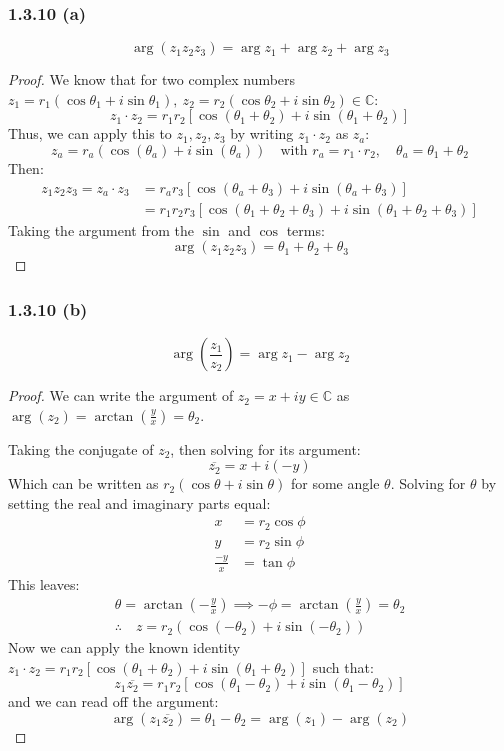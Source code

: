 \documentclass{article}
\begin{document}
\subsubsection*{1.3.10 (a)}
\[
  \arg(z_1 z_2 z_3) = \arg z_1 + \arg z_2 + \arg z_3
\]
\begin{proof}
  We know that for two complex numbers $z_1 = r_1(\cos\theta_1 + i\sin\theta_1),\ z_2 = r_2(\cos\theta_2 + i\sin\theta_2) \in \mathbb{C}$:
  \[
    z_1 \cdot z_2 = r_1 r_2[\cos(\theta_1 + \theta_2) + i\sin(\theta_1 + \theta_2)]
  \]
  Thus, we can apply this to $z_1, z_2, z_3$ by writing $z_1 \cdot z_2$ as $z_a$:
  \[
    z_a = r_a(\cos(\theta_a) + i\sin(\theta_a)) \quad \text{with } r_a = r_1 \cdot r_2, \quad \theta_a = \theta_1 + \theta_2
  \]
  Then:
  \begin{align*}
    z_1 z_2 z_3 = z_a \cdot z_3
      &= r_a r_3[\cos(\theta_a + \theta_3) + i\sin(\theta_a + \theta_3)] \\
      &= r_1 r_2 r_3[\cos(\theta_1 + \theta_2 + \theta_3) + i\sin(\theta_1 + \theta_2 + \theta_3)]
  \end{align*}
  Taking the argument from the $\sin$ and $\cos$ terms:
  \[
    \arg(z_1 z_2 z_3) = \theta_1 + \theta_2 + \theta_3
  \]
\end{proof}

\subsubsection*{1.3.10 (b)}
\[
  \arg\left(\frac{z_1}{z_2}\right) = \arg z_1 - \arg z_2
\]
\begin{proof}
  We can write the argument of $z_2 = x + iy \in \mathbb{C}$ as $\arg(z_2) = \arctan\left(\frac{y}{x}\right) = \theta_2$.

  Taking the conjugate of $z_2$, then solving for its argument:
  \[
    \overline{z_2} = x + i(-y)
  \]
  Which can be written as $r_2(\cos\theta + i\sin\theta)$ for some angle $\theta$. Solving for $\theta$ by setting the real and imaginary parts equal:
  \begin{align*}
    x &= r_2\cos\phi \\
    y &= r_2\sin\phi \\
    \frac{-y}{x} &= \tan\phi
  \end{align*}
  This leaves:
  \begin{gather*}
    \theta = \arctan\left(-\frac{y}{x}\right) \implies -\phi = \arctan\left(\frac{y}{x}\right) = \theta_2 \\[1ex]
    \therefore \quad z = r_2(\cos(-\theta_2) + i\sin(-\theta_2))
  \end{gather*}
  Now we can apply the known identity $z_1 \cdot z_2 = r_1 r_2[\cos(\theta_1 + \theta_2) + i\sin(\theta_1 + \theta_2)]$ such that:
  \[
    z_1\overline{z_2} = r_1 r_2[\cos(\theta_1 - \theta_2) + i\sin(\theta_1 - \theta_2)]
  \]
  and we can read off the argument:
  \[
    \arg(z_1\overline{z_2}) = \theta_1 - \theta_2 = \arg(z_1) - \arg(z_2)
  \]
\end{proof}
\end{document}
